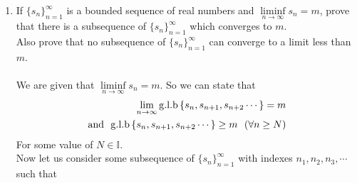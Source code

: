 \documentclass[11pt, letterpaper]{article}
\begin{document}
\begin{enumerate}
{	\begin{eqnarray}
		\lbrace s_{n_j} \rbrace_{j=1}^\infty = \left\lbrace s_{n_1}, s_{n_2}, s_{n_3} \cdots \right\rbrace \\
		\mathrm{Now, \spacem let} \no \\
		T_j = \mathrm{l.u.b} \left\lbrace s_{n_j}, s_{n_{j+1}}, s_{n_{j+2}} \cdots \right\rbrace \\
		\we \spacem \limsup \limits_{j \to \infty} s_{n_j} = \lim \limits_{j \to \infty} T_j \\
		\mathrm{Now, \space} \wealso \no \\
		\mathrm{l.u.b} \left\lbrace s_{n_1} , s_{n_2}, s_{n_3} \cdots \right\rbrace \leq \mathrm{l.u.b} \left\lbrace s_1, s_2, s_3 \cdots \right\rbrace \\
		\mathrm{So \space from \space (8)} \no \\
		\lim \limits_{j \to \infty} \mathrm{l.u.b} \left\lbrace s_{n_j}, s_{n_{j+1}}, s_{n_{j+2}} \cdots \right\rbrace \leq \lim \limits_{n \to \infty} \left\lbrace s_n , s_{n+1}, s_{n+2} \cdots\right\rbrace \\
		\from \mathrm{(9)} \no \\
		\limsup \limits_{n \to \infty} \lbrace s_{n_j} \rbrace_{n=1}^\infty \leq M \spacem \mathrm{Or} \no 
	\end{eqnarray}
	The limit superior of a subsequence of a sequence $ \lbrace s_n \rbrace_{n=1}^\infty $ where $\limsup \limits_{n \to \infty} s_n = M$ is $\leq M$. Hence Proved.
}
\clearpage

\item{If $ \lbrace s_n \rbrace_{n=1}^\infty $ is a bounded sequence of real numbers and $\liminf \limits_{n \to \infty} s_n=m$, prove that there is a subsequence of $ \lbrace s_n \rbrace_{n=1}^\infty $ which converges to $m$. \\
Also prove that no subsequence of $ \lbrace s_n \rbrace_{n=1}^\infty $ can converge to a limit less than $m$.\\\\
	We are given that $\liminf \limits_{n \to \infty} s_n = m $. So we can state that 
	\setcounter{equation}{0}
	\begin{eqnarray}
		\lim \limits_{n \to \infty} \mathrm{g.l.b}\left\lbrace s_n, s_{n+1}, s_{n+2}\cdots\right\rbrace = m \\
		\mathrm{and \,\,\,\,} \mathrm{g.l.b} \left\lbrace s_n, s_{n+1}, s_{n+2} \cdots\right\rbrace \geq m \,\,\,\, (\forall n \geq N)
	\end{eqnarray}
	For some value of $N \in \mathbb{I}$. \\
	Now let us consider some subsequence of $ \lbrace s_n \rbrace_{n=1}^\infty $ with indexes $n_1, n_2, n_3, \cdots$ such that 
	
}
\end{enumerate}
\end{document}
